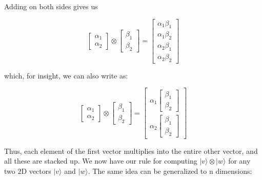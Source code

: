 \documentclass[main.tex]{subfiles}
\begin{document}
    Adding on both sides gives us
    
    $$
    \left[\begin{array}{l}
    \alpha_{1} \\
    \alpha_{2}
    \end{array}\right] \otimes\left[\begin{array}{l}
    \beta_{1} \\
    \beta_{2}
    \end{array}\right]=\left[\begin{array}{l}
    \alpha_{1} \beta_{1} \\
    \alpha_{1} \beta_{2} \\
    \alpha_{2} \beta_{1} \\
    \alpha_{2} \beta_{2}
    \end{array}\right]
    $$
    
    which, for insight, we can also write as:
    
    $$
    \left[\begin{array}{l}
    \alpha_{1} \\
    \alpha_{2}
    \end{array}\right] \otimes\left[\begin{array}{l}
    \beta_{1} \\
    \beta_{2}
    \end{array}\right]=\left[\begin{array}{c}
    \alpha_{1}\left[\begin{array}{l}
    \beta_{1} \\
    \beta_{2}
    \end{array}\right] \\
    \alpha_{2}\left[\begin{array}{l}
    \beta_{1} \\
    \beta_{2}
    \end{array}\right]
    \end{array}\right]
    $$
    
    Thus, each element of the first vector multiplies into the entire other vector, and all these are stacked up. We now have our rule for computing $|v\rangle \otimes|w\rangle$ for any two $2 \mathrm{D}$ vectors $|v\rangle$ and $|w\rangle$. The same idea can be generalized to n dimensions:
\end{document}
